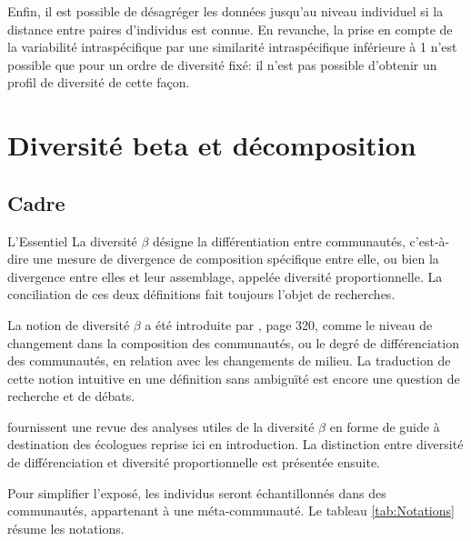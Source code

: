 \documentclass[
  11pt,
  french,
  a4paper,
  extrafontsizes,onecolumn,openright
  ]{memoir}
\newenvironment{Summary}
  {\begin{bclogo}[logo=\bctrombone, noborder=true, couleur=lightgray!50]{L'Essentiel}\parindent0pt}
  {\end{bclogo}}
\begin{document}
Enfin, il est possible de désagréger les données jusqu'au niveau individuel si la distance entre paires d'individus est connue.
En revanche, la prise en compte de la variabilité intraspécifique par une similarité intraspécifique inférieure à 1 n'est possible que pour un ordre de diversité fixé: il n'est pas possible d'obtenir un profil de diversité de cette façon.

\hypertarget{part-diversituxe9-beta-et-duxe9composition}{%
\part{Diversité beta et décomposition}\label{part-diversituxe9-beta-et-duxe9composition}}

\hypertarget{sec:betaCadre}{%
\chapter{Cadre}\label{sec:betaCadre}}

\scriptsize

\normalsize

\scriptsize

\begin{Summary}
La diversité \(\beta\) désigne la différentiation entre communautés,
c'est-à-dire une mesure de divergence de composition spécifique entre
elle, ou bien la divergence entre elles et leur assemblage, appelée
diversité proportionnelle. La conciliation de ces deux définitions fait
toujours l'objet de recherches.
\end{Summary}

\normalsize

La notion de diversité \(\beta\) a été introduite par \textcite{Whittaker1960}, page 320, comme le niveau de changement dans la composition des communautés, ou le degré de différenciation des communautés, en relation avec les changements de milieu.
La traduction de cette notion intuitive en une définition sans ambiguïté est encore une question de recherche et de débats.

\textcite{Anderson2011} fournissent une revue des analyses utiles de la diversité \(\beta\) en forme de guide à destination des écologues reprise ici en introduction.
La distinction entre diversité de différenciation et diversité proportionnelle est présentée ensuite.

Pour simplifier l'exposé, les individus seront échantillonnés dans des communautés, appartenant à une méta-communauté.
Le tableau \ref{tab:Notations} résume les notations.
\end{document}
